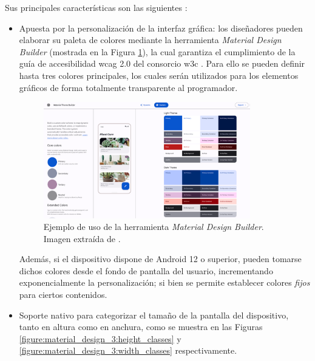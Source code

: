         Sus principales características son las siguientes \cite{material_design_material_nodate}:
        \begin{itemize}
            \item Apuesta por la personalización de la interfaz gráfica: los diseñadores pueden elaborar su paleta de colores mediante la herramienta 
            \textit{Material Design Builder} \cite{material_design_material_nodate-1} (mostrada en la Figura \ref{figure:material_design_3:builder}), la cual garantiza el cumplimiento de la guía de accesibilidad \gls{wcag} 2.0 del consorcio \gls{w3c} \cite{w3c_web_2008}. Para ello se pueden definir hasta tres colores principales, los cuales serán utilizados para los elementos gráficos de forma totalmente transparente al programador.

                \begin{figure}[h]
                    \centering
                    \includegraphics[width=0.85\textwidth]{figures/Material Design Builder example.png}
                    \caption[Ejemplo de uso de la herramienta \textit{Material Design Builder}]
                    {Ejemplo de uso de la herramienta \textit{Material Design Builder}. Imagen extraída de \cite{singh_material_2022}.}
                    \label{figure:material_design_3:builder}
                \end{figure}

            Además, si el dispositivo dispone de Android 12 o superior, pueden tomarse dichos colores desde el fondo de pantalla del usuario, incrementando exponencialmente la personalización; si bien se permite establecer colores \textit{fijos} para ciertos contenidos.
            \item Soporte nativo para categorizar el tamaño de la pantalla del dispositivo, tanto en altura como en anchura, como se muestra en las Figuras \ref{figure:material_design_3:height_classes} y \ref{figure:material_design_3:width_classes} respectivamente.


\end{itemize}
